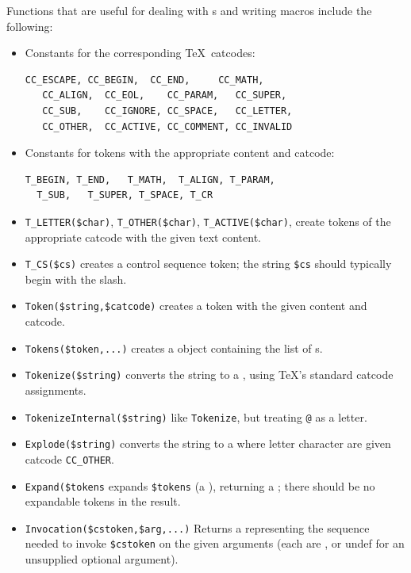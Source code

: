 \documentclass{book}
\newcommand{\ltxcode}{\lstinline[style=latexml]}
\begin{document}
Functions that are useful for dealing with s and writing macros
include the following:
\begin{itemize}
\item Constants for the corresponding \TeX\ catcodes:
\begin{lstlisting}[style=latexml]
   CC_ESCAPE, CC_BEGIN,  CC_END,     CC_MATH,
   CC_ALIGN,  CC_EOL,    CC_PARAM,   CC_SUPER,
   CC_SUB,    CC_IGNORE, CC_SPACE,   CC_LETTER,
   CC_OTHER,  CC_ACTIVE, CC_COMMENT, CC_INVALID
\end{lstlisting}
\item Constants for tokens with the appropriate content and catcode:
\begin{lstlisting}[style=latexml]
  T_BEGIN, T_END,   T_MATH,  T_ALIGN, T_PARAM,
  T_SUB,   T_SUPER, T_SPACE, T_CR
\end{lstlisting}
\item \ltxcode|T_LETTER($char)|, \ltxcode|T_OTHER($char)|, \ltxcode|T_ACTIVE($char)|,
  create tokens of the appropriate catcode with the given text content.
\item \ltxcode|T_CS($cs)| creates a control sequence token; 
  the string \ltxcode|$cs| should typically begin with the slash.
\item \ltxcode|Token($string,$catcode)| creates a token with the given content and catcode.
\item \ltxcode|Tokens($token,...)| creates a  object
   containing the list of s.
\item \ltxcode|Tokenize($string)| converts the string to a ,
   using \TeX's standard catcode assignments.
\item \ltxcode|TokenizeInternal($string)| like \texttt{Tokenize}, but
   treating \ltxcode|@| as a letter.
\item \ltxcode|Explode($string)| converts the string to a  where
   letter character are given catcode \ltxcode|CC_OTHER|.
\item \ltxcode|Expand($tokens| expands \ltxcode|$tokens| (a ), returning
  a ; there should be no expandable tokens in the result.
\item \ltxcode|Invocation($cstoken,$arg,...)| Returns a  representing
  the sequence needed to invoke \ltxcode|$cstoken| on the given arguments (each are
  , or undef for an unsupplied optional argument).
\end{itemize}
\end{document}
